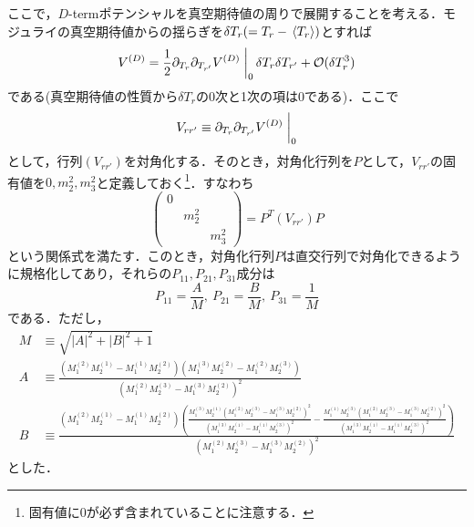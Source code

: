 \documentclass[a4paper,uplatex,dvipdfmx]{jsarticle}
\theoremstyle{definition}
\begin{document}
ここで，$D$-termポテンシャルを真空期待値の周りで展開することを考える．モジュライの真空期待値からの揺らぎを$\delta T_{r}(=T_{r}-\ev*{T_{r}})$とすれば
\begin{equation}
   V^{(D)}
   =
   \frac{1}{2}
   \partial_{T_{r}}\partial_{T_{r'}}V^{(D)}
   \left.\vphantom{\frac{1}{2}}\right|_{0}
   \delta T_{r}\delta T_{r'}
   +
   \mathcal{O}(\delta T_{r}^{3})
   \label{D-term_potential_3}
\end{equation}
である(真空期待値の性質から$\delta T_{r}$の0次と1次の項は0である)．ここで
\begin{equation}
   V_{rr'}
   \equiv
   \partial_{T_{r}}\partial_{T_{r'}}V^{(D)}
   \left.\vphantom{\frac{1}{2}}\right|_{0}
   \nonumber
\end{equation}
として，行列$(V_{rr'})$を対角化する．そのとき，対角化行列を$P$として，$V_{rr'}$の固有値を$0,m_{2}^{2},m_{3}^{2}$と定義しておく\footnote{
   固有値に0が必ず含まれていることに注意する．
}．すなわち
\begin{equation}
   \begin{pmatrix}
      0 &  & \\
      & m_{2}^2 & \\
      & & m_{3}^{2}
   \end{pmatrix}
   =
   P^{T}
   (V_{rr'})
   P
   \label{eigencal_V}
\end{equation}
という関係式を満たす．このとき，対角化行列$P$は直交行列で対角化できるように規格化してあり，それらの$P_{11},P_{21},P_{31}$成分は
\begin{equation}
   P_{11}
   =
   \frac{A}{M}
   ,\ 
   P_{21}
   =
   \frac{B}{M}
   ,\ 
   P_{31}
   =
   \frac{1}{M}
   \label{P_components}
\end{equation}
である．ただし，
\begin{align}
   M
   &\equiv
   \sqrt{\left| A\right| ^2+\left| B\right| ^2+1}
   \nonumber
   \\
   A
   &\equiv
   \frac{(M_{1}^{(2)} M_{2}^{(1)}-M_{1}^{(1)} M_{2}^{(2)}) \left(M_{1}^{(3)} M_{2}^{(2)} -M_{1}^{(2)} M_{2}^{(3)} \right)}{(M_{1}^{(2)} M_{2}^{(3)}-M_{1}^{(3)} M_{2}^{(2)})^2 }
   \nonumber
   \\
   B
   &\equiv
   \frac{(M_{1}^{(2)} M_{2}^{(1)}-M_{1}^{(1)} M_{2}^{(2)}) \left(\frac{M_{1}^{(3)} M_{2}^{(1)} (M_{1}^{(2)} M_{2}^{(3)} -M_{1}^{(3)} M_{2}^{(2)} )^2}{(M_{1}^{(3)} M_{2}^{(1)}-M_{1}^{(1)} M_{2}^{(3)})^2}-\frac{M_{1}^{(1)} M_{2}^{(3)} (M_{1}^{(2)} M_{2}^{(3)} -M_{1}^{(3)} M_{2}^{(2)} )^2}{(M_{1}^{(3)} M_{2}^{(1)}-M_{1}^{(1)} M_{2}^{(3)})^2}\right)}{(M_{1}^{(2)} M_{2}^{(3)}-M_{1}^{(3)} M_{2}^{(2)})^2}
   \nonumber
\end{align}
とした．
\end{document}
